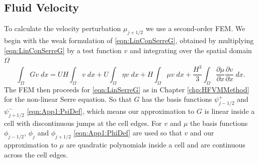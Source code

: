 \subsection{Fluid Velocity}
To calculate the velocity perturbation $\mu_{j+1/2}$ we use a second-order FEM. We begin with the weak formulation of \eqref{eqn:LinConSerreG}, obtained by multiplying \eqref{eqn:LinConSerreG} by a test function $v$ and integrating over the spatial domain $\Omega$
\begin{equation*}
\int_{\Omega}G v \; dx = UH\int_{\Omega} v \; dx + U \int_{\Omega} \eta v \; dx +   H\int_{\Omega} \mu v \; dx  + \frac{H^3}{3} \int_{\Omega} \frac{\partial \mu}{\partial x } \frac{\partial v}{\partial x }\; dx.
\end{equation*}
The FEM then proceeds for \eqref{eqn:LinSerreG} as in Chapter \ref{chp:HFVMMethod} for the non-linear Serre equation. So that $G$ has the basis functions $\psi^+_{j - 1/2}$ and $\psi^-_{j + 1/2}$ \eqref{eqn:App1:PsiDef}, which means our approximation to $G$ is linear inside a cell with discontinuous jumps at the cell edges. For $v$ and $\mu$ the basis functions $\phi_{j-1/2}$, $\phi_{j}$ and $\phi_{j+1/2}$ \eqref{eqn:App1:PhiDef} are used so that $v$ and our approximation to $\mu$ are quadratic polynomials inside a cell and are continuous across the cell edges.

